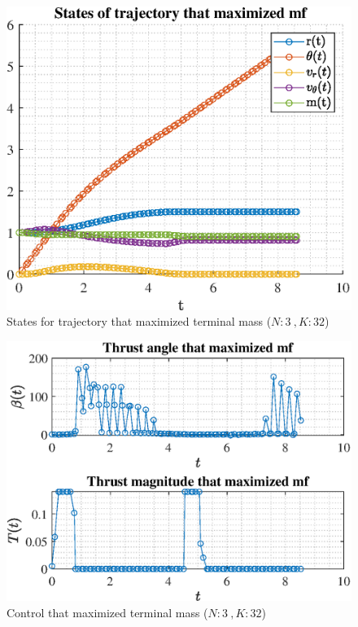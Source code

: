\documentclass[]{article}
\begin{document}
	\begin{figure}
		\centering
		\includegraphics[scale=0.75]{states_N3_K32_C3_mf.eps}
		\caption{States for trajectory that maximized terminal mass (\(N:3\ , K:32\))}
		\label{fig:states_N3_K32_C3_mf}
	\end{figure}
	\begin{figure}
		\centering
		\includegraphics[scale=0.75]{control_N3_K32_C3_mf.eps}
		\caption{Control that maximized terminal mass (\(N:3\ , K:32\))}
		\label{fig:control_N3_K32_C3_mf}
	\end{figure}
\end{document}
